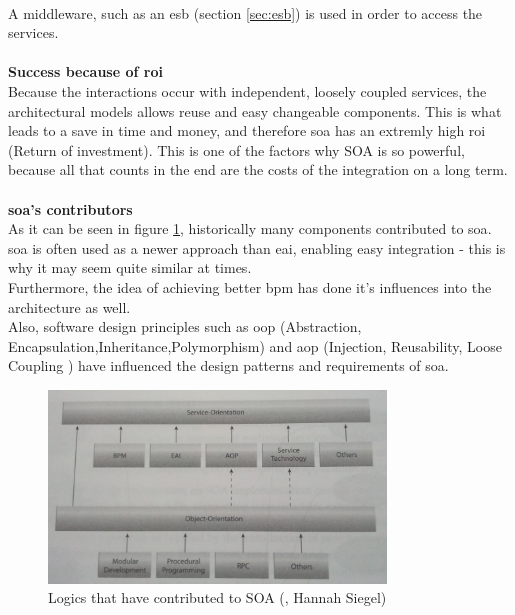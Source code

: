 \documentclass[12pt]{article}
\begin{document}
\\ A middleware, such as an \gls{esb} (section \ref{sec:esb}) is used in order to access the services.
\\ \\
\textbf{Success because of \gls{roi}}\\
Because the interactions occur with independent, loosely coupled services, the architectural models allows reuse and easy changeable components. This is what leads to a save in time and money, and therefore \gls{soa} has an extremly high \gls{roi} (Return of investment). This is one of the factors why SOA is so powerful, because all that counts in the end are the costs of the integration on a long term. \cite{searchsoa}
\\\\
\textbf{\gls{soa}'s contributors}\\
As it can be seen in figure \ref{fig:eaipartofso}, historically many components contributed to \gls{soa}. \\
\gls{soa} is often used as a newer approach than \gls{eai}, enabling easy integration - this is why it may seem quite similar at times. \cite{soaitwissen} \\ Furthermore, the idea of achieving better \gls{bpm} has done it's influences into the architecture as well. \\
Also, software design principles such as \gls{oop} (Abstraction, Encapsulation,Inheritance,Polymorphism) and \gls{aop} (Injection, Reusability, Loose Coupling \cite{aopdi}) have influenced the design patterns and requirements of \gls{soa}. \\

\begin{figure}[here!]
	\centering
	\includegraphics[width=0.8\textwidth]{images/b1_25}
	\caption{Logics that have contributed to SOA (\cite[page 25]{grau}, Hannah Siegel)}
	\label{fig:eaipartofso}
	\end{figure}
	\FloatBarrier
\noindent
	\newpage
\end{document}
